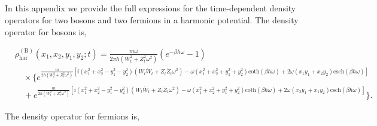 \documentclass[preprints,article,accept,moreauthors,pdftex]{Definitions/mdpi}
\begin{document}
\begin{paracol}{2}



\pagebreak

\appendixstart
\appendix
\section{}
\label{AppendixA}
In this appendix we provide the full expressions for the time-dependent density operators for two bosons and two fermions in a harmonic potential. The density operator for bosons is,

\vspace{-9pt}

\begin{adjustwidth}{-4.6cm}{0cm}
\begin{equation}
	\begin{split}
		&\rho_{\mathrm{har}}^{(\mathrm{B})}(x_1,x_2,y_1,y_2;t)= \frac{m \omega}{2 \pi \hbar (W_t^2+Z_t^2 \omega^2)} \left(e^{-\beta \hbar \omega}-1\right) \\
		&\quad\times\bigg\{ e^{\frac{m}{2 \hbar (W_t^2+Z_t^2 \omega^2)}\left[i (x_1^2+x_2^2-y_1^2-y_2^2)(W_t \dot{W}_t+Z_t\dot{Z}_t\omega^2)-\omega (x_1^2+x_2^2+y_1^2+y_2^2) \mathrm{coth}(\beta \hbar \omega)
			+2 \omega (x_1 y_1 +x_2 y_2) \mathrm{csch}(\beta \hbar \omega) \right]} \\
		&\quad+ e^{\frac{m}{2 \hbar (W_t^2+Z_t^2 \omega^2)}\left[i (x_1^2+x_2^2-y_1^2-y_2^2)(W_t \dot{W}_t+Z_t\dot{Z}_t\omega^2)
			- \omega(x_1^2+x_2^2+y_1^2+y_2^2) \mathrm{coth}(\beta \hbar \omega)+2 \omega (x_2 y_1 +x_1 y_2) \mathrm{csch}(\beta \hbar \omega) \right]} \bigg\}.
	\end{split}
\end{equation}
\end{adjustwidth}

The density operator for fermions is,


\end{paracol}
\end{document}
